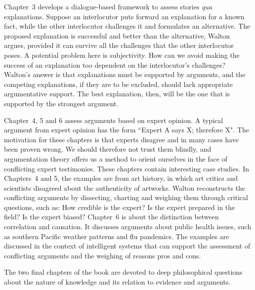 \documentclass[12pt,a4paper]{article}
\begin{document}
Chapter~3 develops a dialogue-based framework to assess stories \textit{qua}
explanations. Suppose an interlocutor puts forward an explanation for
a known fact, while the other interlocutor challenges it and
formulates an alternative. The proposed explanation is successful and
better than the alternative, Walton argues, provided it can survive all
the challenges that the other interlocutor poses. A potential problem here is subjectivity. How can we avoid
making the success of an explanation too dependent on the interlocutor's challenges? Walton's answer is that explanations must be supported
by arguments, %
and the competing explanations, if they are to
be excluded, should lack appropriate argumentative support. 
The best explanation, then, will be the one that is 
supported by the strongest argument.

Chapter~4, 5 and 6 
assess arguments based on expert opinion.
A typical argument from
expert opinion has the form ``Expert A says X; therefore X". The motivation for these chapters is that experts
disagree and in many cases have been proven wrong. We should therefore not
trust them blindly, and argumentation theory offers us a method to
orient ourselves in the face of conflicting expert testimonies. These chapters contain 
interesting case studies. In Chapters~4 and 5, the examples are 
from art history, in which art critics and scientists disagreed about
the authenticity of artworks. Walton reconstructs the conflicting
arguments by dissecting, charting and weighing them through critical
questions, such as: How credible is the expert? Is the expert prepared
in the field? Is the expert biased? Chapter~6 is about the distinction between correlation and causation. 
It discusses arguments about public health issues, such as southern Pacific weather patterns and flu pandemics. The examples are discussed in the context of 
intelligent systems that can support the assessment of
conflicting arguments and the weighing of reasons pros and cons.

The two final chapters of the book are devoted to deep philosophical
questions about the nature of knowledge and its relation to evidence and arguments.
\end{document}
